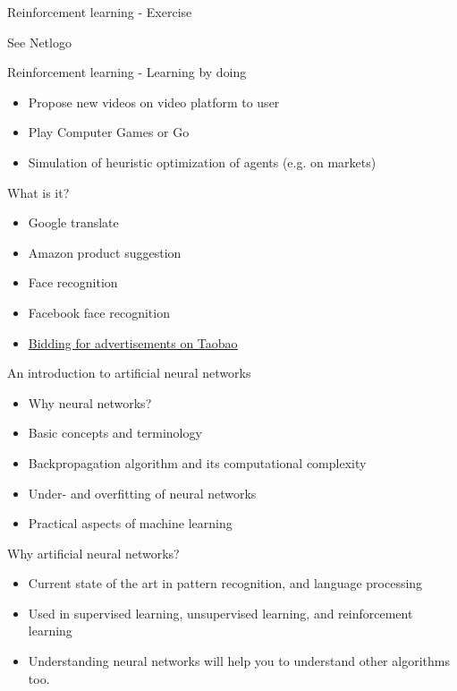\documentclass[color=usenames,dvipsnames]{beamer}
\begin{document}
\begin{frame}{Reinforcement learning - Exercise} 

See Netlogo

\end{frame}

\begin{frame}{Reinforcement learning - Learning by doing} 

\begin{itemize}
	\item Propose new videos on video platform to user
	\item Play Computer Games or Go
	\item Simulation of heuristic optimization of agents (e.g. on markets)
\end{itemize}

\end{frame}

\begin{frame}{What is it?} 

\begin{itemize}
	\item Google translate
	\item Amazon product suggestion
	\item Face recognition
	\item Facebook face recognition
	\item \href{https://arxiv.org/pdf/1802.09756.pdf}{\underline{Bidding for advertisements on Taobao}}
\end{itemize}

\end{frame}

\begin{frame}{An introduction to artificial neural networks} 

\begin{itemize}
	\item Why neural networks?
	\item Basic concepts and terminology
	\item Backpropagation algorithm and its computational complexity
	\item Under- and overfitting of neural networks
	\item Practical aspects of machine learning
\end{itemize}

\end{frame}


\begin{frame}{Why artificial neural networks?} 

\begin{itemize}
	\item Current state of the art in pattern recognition, and language processing
	\item Used in supervised learning, unsupervised learning, and reinforcement learning
	\item Understanding neural networks will help you to understand other algorithms too.
	
\end{itemize}

\end{frame}
\end{document}

